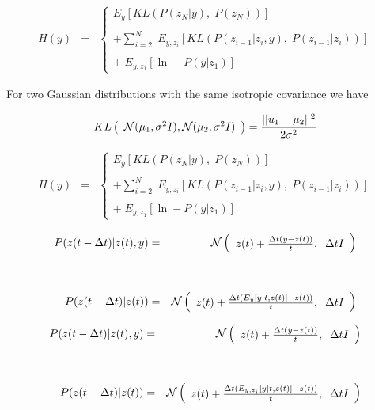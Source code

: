 {{\huge
\begin{eqnarray*}
  H(y) & = & \left\{\begin{array}{l} E_y[KL(P(z_N|y),\;P(z_N))] \\ \\ + \sum_{i=2}^N  \; E_{y,z_i}[KL(P(z_{i-1}|z_i,y),\;P(z_{i-1}|z_i))] \\ \\ +\;E_{y,z_1}[\ln -P(y|z_1)] \end{array}\right.
  \end{eqnarray*}

\vfill
For two Gaussian distributions with the same isotropic covariance we have

\vfill
$$KL\left(\begin{array}{l}{\cal N}(\mu_1,\sigma^2 I), {\cal N}(\mu_2,\sigma^2 I) \end{array}\right) = \frac{||u_1 -\mu_2||^2}{2\sigma^2}$$
}

{\huge
\begin{eqnarray*}
  H(y) & = & \left\{\begin{array}{l} E_y[KL(P(z_N|y),\;P(z_N))] \\ \\ + \sum_{i=2}^N  \; E_{y,z_i}[KL(P(z_{i-1}|z_i,y),\;P(z_{i-1}|z_i))] \\ \\ +\;E_{y,z_1}[\ln -P(y|z_1)] \end{array}\right.
\end{eqnarray*}

\vfill
\begin{eqnarray*}
  P(z(t - \Delta t)|z(t),y) & = & {\cal N}\left(\begin{array}{l}z(t) + \frac{\Delta t(y - z(t))}{t},\;\; \Delta t I\end{array}\right) \\
  \\
  \\
  P(z(t - \Delta t)|z(t)) & = & {\cal N}\left(\begin{array}{l} z(t) + \frac{\Delta t(E_y[y|t,z(t)] - z(t))}{t}, \;\; \Delta t I\end{array}\right)
\end{eqnarray*}
}

{\huge
\begin{eqnarray*}
  P(z(t - \Delta t)|z(t),y) & = & {\cal N}\left(\begin{array}{l}z(t) + \frac{\Delta t(y - z(t))}{t},\;\; \Delta t I\end{array}\right) \\
  \\
  \\
  P(z(t - \Delta t)|z(t)) & = & {\cal N}\left(\begin{array}{l} z(t) + \frac{\Delta t(E_{y,z_i}[y|t,z(t)] - z(t))}{t}, \;\; \Delta t I\end{array}\right)
\end{eqnarray*}

}}
